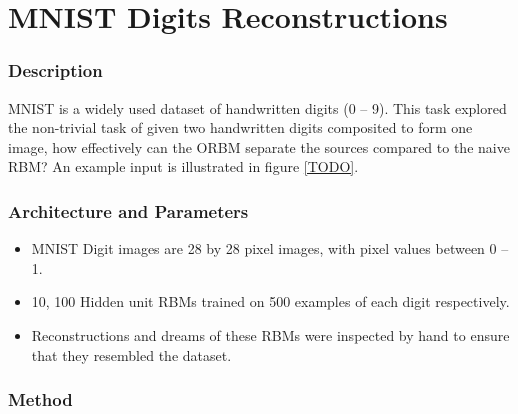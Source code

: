     \section{MNIST Digits Reconstructions}

    \subsubsection{Description}

    MNIST is a widely used dataset of handwritten digits (0 -- 9). This task explored the non-trivial task of given two handwritten digits composited to form one image, how effectively can the ORBM separate the sources compared to the naive RBM? An example input is illustrated in figure \ref{TODO}.

    \subsubsection{Architecture and Parameters}

    \begin{itemize}
      \item MNIST Digit images are 28 by 28 pixel images, with pixel values between 0 -- 1.
      \item 10, 100 Hidden unit RBMs trained on 500 examples of each digit respectively.
      \item Reconstructions and dreams of these RBMs were inspected by hand to ensure that they resembled the dataset.
    \end{itemize}

    \subsubsection{Method}

